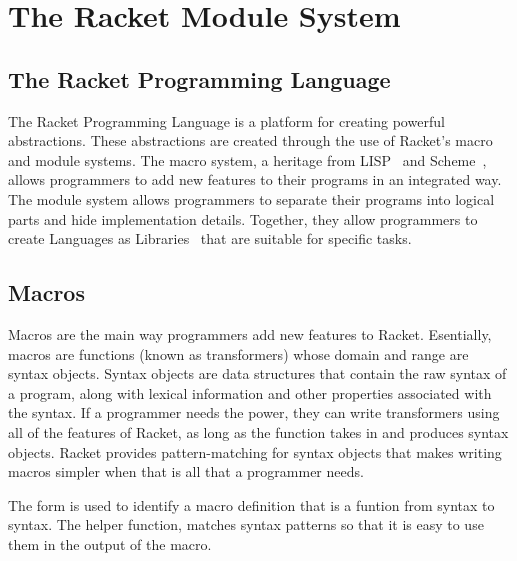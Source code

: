 \chapter{The Racket Module System}
\label{chap:module-system}

\section{The Racket Programming Language}
The Racket Programming Language is a platform for creating powerful abstractions.
These abstractions are created through the use of Racket's macro and module systems. 
The macro system, a heritage from LISP~\cite{} and Scheme~\cite{}, allows programmers to add new features to their programs in an integrated way.
The module system allows programmers to separate their programs into logical parts and hide implementation details. 
Together, they allow programmers to create Languages as Libraries~\cite{} that are suitable for specific tasks.

\section{Macros}
Macros are the main way programmers add new features to Racket. 
Esentially, macros are functions (known as transformers) whose domain and range are syntax objects.
Syntax objects are data structures that contain the raw syntax of a program, along with lexical information and other properties associated with the syntax.
If a programmer needs the power, they can write transformers using all of the features of Racket, as long as the function takes in and produces syntax objects.
Racket provides pattern-matching for syntax objects that makes writing macros simpler when that is all that a programmer needs.

The  form is used to identify a macro definition that is a funtion from syntax to syntax.
The helper function,  matches syntax patterns so that it is easy to use them in the output of the macro.

